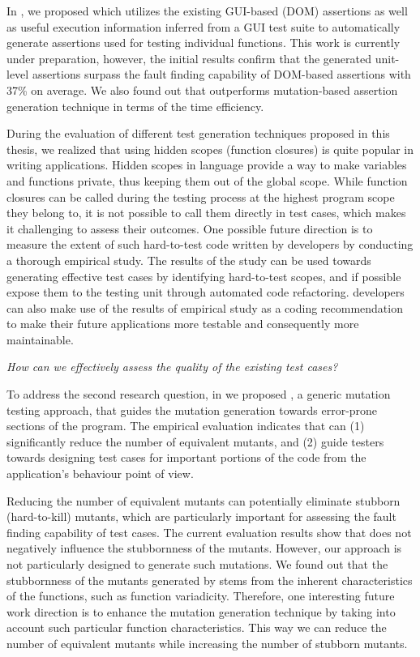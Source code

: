 In , we proposed \atrina which utilizes the existing GUI-based (\ie DOM) assertions as well as useful execution information inferred from a GUI test suite to automatically generate assertions used for testing individual functions. This work is currently under preparation, however, the initial results confirm that the generated unit-level assertions surpass the fault finding capability of DOM-based assertions with 37\% on average. We also found out that \atrina outperforms mutation-based assertion generation technique in terms of the time efficiency.

During the evaluation of different test generation techniques proposed in this thesis, we realized that using hidden scopes (\ie function closures) is quite popular in writing \javascript applications. 
Hidden scopes in \javascript language provide a way to make variables and functions private, thus keeping them out of the global scope.
While function closures can be called during the testing process at the highest program scope they belong to, it is not possible to call them directly in test cases, which makes it challenging to assess their outcomes.
One possible future direction is to measure the extent of such hard-to-test code written by developers by conducting a thorough empirical study.
The results of the study can be used towards generating effective test cases by identifying hard-to-test scopes, and if possible expose them to the testing unit through automated code refactoring. \javascript developers can also make use of the results of empirical study as a coding recommendation to make their future applications more testable and consequently more maintainable.


\emph{How can we effectively assess the quality of the existing \javascript test cases?}

To address the second research question, in  we proposed \mutandis, a generic mutation testing approach, that guides the mutation generation towards error-prone sections of the program. The empirical evaluation indicates that \mutandis can (1) significantly reduce the number of equivalent mutants, and (2) guide testers towards designing test cases for important portions of the code from the application's behaviour point of view. 

Reducing the number of equivalent mutants can potentially eliminate stubborn (hard-to-kill) mutants, which are particularly important for assessing the fault finding capability of test cases. The current evaluation results show that \mutandis does not negatively influence the stubbornness of the mutants.
However, our approach is not particularly designed to generate such mutations.
We found out that the stubbornness of the mutants generated by \mutandis stems from the inherent characteristics of the \javascript functions, such as function variadicity. Therefore, one interesting future work direction is to enhance the mutation generation technique by taking into account such particular function characteristics. This way we can reduce the number of equivalent mutants while increasing the number of stubborn mutants.

